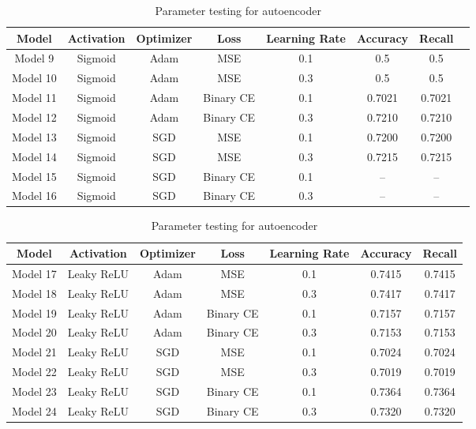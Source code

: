 \begin{table}[H]
    \centering
    \begin{tabularx}{\textwidth}{|c|c|c|c|c|c|c|c|}
        \hline
        \rowcolor{lightgreen}
        \textbf{Model} & \textbf{Activation} & \textbf{Optimizer} & \textbf{Loss} & \textbf{Learning Rate} & \textbf{Accuracy} & \textbf{Recall} \\
        \hline
        Model 9 & Sigmoid & Adam & MSE & 0.1 & 0.5 & 0.5 \\
        \hline
        Model 10 & Sigmoid & Adam & MSE & 0.3 & 0.5 & 0.5 \\
        \hline
        Model 11 & Sigmoid & Adam & Binary CE & 0.1 & 0.7021 & 0.7021 \\
        \hline
        Model 12 & Sigmoid & Adam & Binary CE & 0.3 & 0.7210 & 0.7210 \\
        \hline
        Model 13 & Sigmoid & SGD & MSE & 0.1 & 0.7200 & 0.7200 \\
        \hline
        Model 14 & Sigmoid & SGD & MSE & 0.3 & 0.7215 & 0.7215 \\
        \hline
        Model 15 & Sigmoid & SGD & Binary CE & 0.1 & -- & -- \\
        \hline
        Model 16 & Sigmoid & SGD & Binary CE & 0.3 & -- & -- \\
        \hline
    \end{tabularx}
    \caption{Parameter testing for autoencoder}
    \label{tab:op2}
\end{table}
\begin{table}[H]
    \centering
    \begin{tabularx}{\textwidth}{|c|c|c|c|c|c|c|}
        \hline
        \textbf{Model} & \textbf{Activation} & \textbf{Optimizer} & \textbf{Loss} & \textbf{Learning Rate} & \textbf{Accuracy} & \textbf{Recall} \\
        \hline
        Model 17 & Leaky ReLU & Adam & MSE & 0.1 & 0.7415 & 0.7415 \\
        \hline
        Model 18 & Leaky ReLU & Adam & MSE & 0.3 & 0.7417 & 0.7417 \\
        \hline
        Model 19 & Leaky ReLU & Adam & Binary CE & 0.1 & 0.7157 & 0.7157 \\
        \hline
        Model 20 & Leaky ReLU & Adam & Binary CE & 0.3 & 0.7153 & 0.7153 \\
        \hline
        Model 21 & Leaky ReLU & SGD & MSE & 0.1 & 0.7024 & 0.7024 \\
        \hline
        Model 22 & Leaky ReLU & SGD & MSE & 0.3 & 0.7019 & 0.7019 \\
        \hline
        Model 23 & Leaky ReLU & SGD & Binary CE & 0.1 & 0.7364 & 0.7364 \\
        \hline
        Model 24 & Leaky ReLU & SGD & Binary CE & 0.3 & 0.7320 & 0.7320 \\
        \hline
    \end{tabularx}
    \caption{Parameter testing for autoencoder}
    \label{tab:op3}
\end{table}
